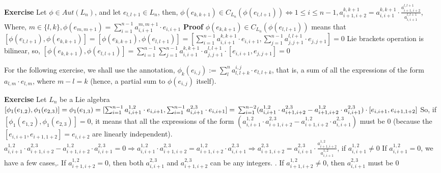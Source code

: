 \documentclass[12pt]{article}
\begin{document}
\newpage
\textbf{Exercise}
Let $\phi \in Aut(L_n)$, and let $e_{l,l+1} \in L_n$, then, \newline
$\phi(e_{k,k+1}) \in C_{L_n}(\phi(e_{l,l+1})) \Leftrightarrow 1 \leq i \leq n-1,
a_{i+1,i+2}^{k,k+1}=a_{i,i+1}^{k,k+1} \cdot \frac{a_{i+1,i+2}^{l,l+1}}{a_{i,i+1}^{l,l+1}}$, \newline
Where, \newline
$m \in \{l,k\},\phi(e_{m,m+1})=\sum_{i=1}^{n-1} a_{i,i+1}^{m,m+1} \cdot e_{i,i+1}$ \newline
\textbf{Proof} \newline
$\phi(e_{k,k+1}) \in C_{L_n}(\phi(e_{l,l+1}))$ means that $[\phi(e_{l,l+1}),\phi(e_{k,k+1})]=[\phi(e_{k,k+1}),\phi(e_{l,l+1})]=[\sum_{i=1}^{n-1} a_{i,i+1}^{k,k+1} \cdot e_{i,i+1},\sum_{j=1}^{n-1} a_{j,j+1}^{l,l+1} \cdot e_{j,j+1}]=0$ \newline
Lie brackets operation is bilinear, so, \newline
$[\phi(e_{k,k+1}),\phi(e_{l,l+1})]=\sum_{i=1}^{n-1} \sum_{j=1}^{n-1} a_{i,i+1}^{k,k+1} \cdot a_{j,j+1}^{l,l+1} \cdot [e_{i,i+1},e_{j,j+1}]=0$ \newline

For the following exercise, we shall use the annotation, \newline
$\phi_k(e_{i,j}):=\sum_l^n a_{l,l+k}^{i,j} \cdot e_{l,l+k}$, that is, a sum of all the expressions of the form $a_{l,m} \cdot e_{l,m}$, where $m-l=k$ (hence, a partial sum to $\phi(e_{i,j})$ itself). \newline

\textbf{Exercise} \newline
Let $L_n$ be a Lie algebra \newline
$[\phi_1(e_{1,2}),\phi_1(e_{2,3})]=\phi_1(e_{1,3})=
[\sum_{i=1}^{n-1} a_{i,i+1}^{1,2} \cdot e_{i,i+1},\sum_{i=1}^{n-1} a_{i,i+1}^{2,3} \cdot e_{i,i+1}]= \newline
\sum_{i=1}^{n-2} (a_{i,i+1}^{1,2} \cdot a_{i+1,i+2}^{2,3}-a_{i+1,i+2}^{1,2} \cdot a_{i,i+1}^{2,3}) \cdot [e_{i,i+1},e_{i+1,1+2}]$ \newline
So, if $[\phi_1(e_{1,2}),\phi_1(e_{2,3})]=0$,
it means that all the expressions of the form $(a_{i,i+1}^{1,2} \cdot a_{i+1,i+2}^{2,3}-a_{i+1,i+2}^{1,2} \cdot a_{i,i+1}^{2,3})$ must be 0 (because the $[e_{i,i+1},e_{i+1,1+2}]=e_{i,i+2}$ are linearly independent). \newline
$a_{i,i+1}^{1,2} \cdot a_{i+1,i+2}^{2,3}-a_{i+1,i+2}^{1,2} \cdot a_{i,i+1}^{2,3}=0 \Rightarrow a_{i,i+1}^{1,2} \cdot a_{i+1,i+2}^{2,3}=a_{i+1,i+2}^{1,2} \cdot a_{i,i+1}^{2,3} \Rightarrow a_{i+1,i+2}^{2,3}=a_{i,i+1}^{2,3} \cdot \frac{a_{i+1,i+2}^{1,2}}{a_{i,i+1}^{1,2}}$, if $a_{i,i+1}^{1,2} \neq 0$ \newline
If $a_{i,i+1}^{1,2}=0$, we have a few cases,. If $a_{i+1,i+2}^{1,2}=0$, then both $a_{i,i+1}^{2,3}$ and $a_{i+1,i+2}^{2,3}$ can be any integers. . If $a_{i+1,i+2}^{1,2} \neq 0$, then $a_{i,i+1}^{2,3}$ must be $0$ \newline
\end{document}
